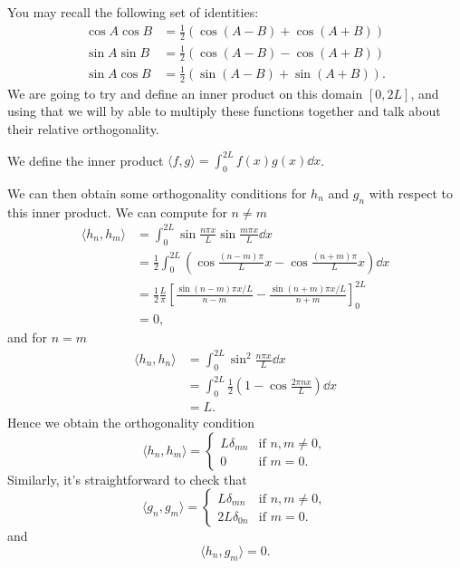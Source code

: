 You may recall the following set of identities:
\begin{align*}
    \cos A \cos B &= \frac{1}{2}\left(\cos(A - B) + \cos(A + B)\right) \\
    \sin A \sin B &= \frac{1}{2}\left(\cos(A - B) - \cos(A + B)\right) \\
    \sin A \cos B &= \frac{1}{2}\left(\sin(A - B) + \sin(A + B)\right).
\end{align*}
We are going to try and define an inner product on this domain $[0, 2L]$, and using that we will by able to multiply these functions together and talk about their relative orthogonality.

\begin{definition}
    We define the inner product
    $\langle f, g \rangle = \int_0^{2L} f(x) g(x) \dd x$.
\end{definition}

We can then obtain some orthogonality conditions for $h_n$ and $g_n$ with respect to this inner product. We can compute for $n \neq m$
\begin{align*}
    \langle h_n, h_m \rangle &= \int_0^{2L} \sin \frac{n \pi x}{L} \sin \frac{m \pi x}{L} \dd x \\
    &= \frac{1}{2}\int_0^{2L} \left(\cos \frac{(n -m) \pi }{L}x - \cos \frac{(n + m )\pi}{L} x\right) \dd x \\
    &= \frac{1}{2} \frac{L}{\pi}\left[\frac{\sin (n - m) \pi x /L}{n - m} - \frac{\sin (n + m) \pi x /L}{n + m}\right]_0^{2L} \\
    &= 0,
\end{align*}
and for $n = m$
\begin{align*}
    \langle h_n, h_n \rangle &= \int_0^{2L} \sin^2 \frac{n \pi x}{L} \dd x \\
                             &= \int_0^{2L} \frac{1}{2}\left(1 - \cos \frac{2 \pi n x}{L}\right) \dd x \\
                             &= L.
\end{align*}
Hence we obtain the orthogonality condition
$$
\langle h_n, h_m \rangle = \begin{cases}
    L \delta_{mn} &\mbox{if } n, m \neq 0, \\
    0 &\mbox{if } m = 0.
   \end{cases}
$$
Similarly, it's straightforward to check that
$$
\langle g_n, g_m \rangle = \begin{cases}
    L \delta_{mn} &\mbox{if } n, m \neq 0, \\
    2L \delta_{0n} &\mbox{if } m = 0.
   \end{cases}
$$
and
$$
\langle h_n, g_m \rangle = 0.
$$

